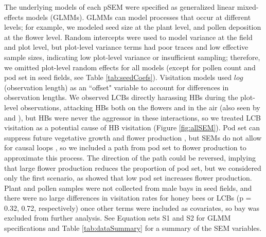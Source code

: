 \documentclass[12pt]{article} %
\begin{document}
The underlying models of each pSEM were specified as generalized linear mixed-effects models (GLMMs).
GLMMs can model processes that occur at different levels; for example, we modeled seed size at the plant level, and pollen deposition at the flower level.
Random intercepts were used to model variance at the field and plot level, but plot-level variance terms had poor traces and low effective sample sizes, indicating low plot-level variance or insufficient sampling; therefore, we omitted plot-level random effects for all models (except for pollen count and pod set in seed fields, see Table \ref{tab:seedCoefs}).
Visitation models used $log$(observation length) as an ``offset" variable to account for differences in observation lengths.
We observed LCBs directly harassing HBs during the plot-level observations, attacking HBs both on the flowers and in the air (also seen by \citealp{batra1978} and \citealp{waytes2022}), but HBs were never the aggressor in these interactions, so we treated LCB visitation as a potential cause of HB visitation (Figure \ref{fig:allSEM}).
Pod set can suppress future vegetative growth and flower production \citep{stephenson1981}, but SEMs do not allow for causal loops \citep{grace2012}, so we included a path from pod set to flower production to approximate this process.
The direction of the path could be reversed, implying that large flower production reduces the proportion of pod set, but we considered only the first scenario, as \citet{sabbahi2006} showed that low pod set increases flower production.
Plant and pollen samples were not collected from male bays in seed fields, and there were no large differences in visitation rates for honey bees or LCBs (p = 0.32, 0.72, respectively) once other terms were included as covariates, so bay was excluded from further analysis.
See Equation sets S1 and S2 for GLMM specifications and Table \ref{tab:dataSummary} for a summary of the SEM variables.
\end{document}
